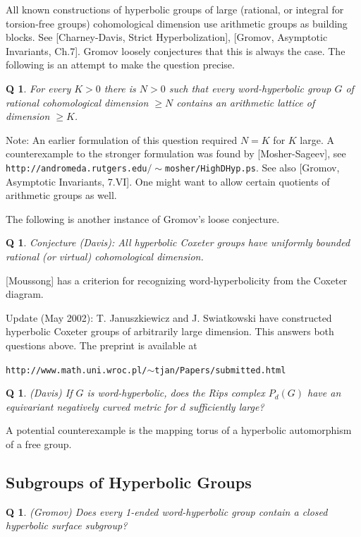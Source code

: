 \documentclass[11pt]{article}
\newtheorem{q}[thm]{Q}
\theoremstyle{remark}
\newcommand{\<}{\langle}
\renewcommand{\>}{\rangle}
\begin{document}
All known constructions of hyperbolic groups of large (rational, or integral
for torsion-free groups) cohomological dimension use arithmetic groups as
building blocks. See [Charney-Davis, Strict Hyperbolization], [Gromov,
Asymptotic Invariants, Ch.7]. Gromov loosely conjectures that this is always
the case. The following is an attempt to make the question precise.

\begin{q}
For every $K>0$ there is $N>0$ such that every
    word-hyperbolic group $G$ of rational cohomological dimension $\geq N$
    contains an arithmetic lattice of dimension $\geq K$.
\end{q}

Note: An earlier formulation of this question required $N=K$ for $K$ large. A
counterexample to the stronger formulation was found by [Mosher-Sageev], see
{\tt http://andromeda.rutgers.edu$/\sim$mosher/HighDHyp.ps}. See also [Gromov,
Asymptotic Invariants, 7.VI]. One might want to allow certain quotients of
arithmetic groups as well.

The following is another instance of Gromov's loose conjecture.

\begin{q}
Conjecture (Davis): All hyperbolic
Coxeter groups have uniformly bounded rational (or virtual) cohomological
dimension. 
\end{q}
[Moussong] has a criterion for recognizing word-hyperbolicity
from the Coxeter diagram.

Update (May 2002): T. Januszkiewicz and J. Swiatkowski have
constructed hyperbolic Coxeter groups of arbitrarily large
dimension. This answers both questions above. The preprint is available
at

{\tt http://www.math.uni.wroc.pl/$\sim$tjan/Papers/submitted.html}

\begin{q}
(Davis) If $G$ is word-hyperbolic, does the Rips complex $P_d(G)$
have an equivariant negatively curved metric for $d$ sufficiently large?
\end{q}

A potential counterexample is the mapping torus of a hyperbolic automorphism
of a free group. 

\subsection{Subgroups of Hyperbolic Groups}

\begin{q}
(Gromov) Does every 1-ended word-hyperbolic group contain a
closed hyperbolic surface subgroup?
\end{q} 
\end{document}

